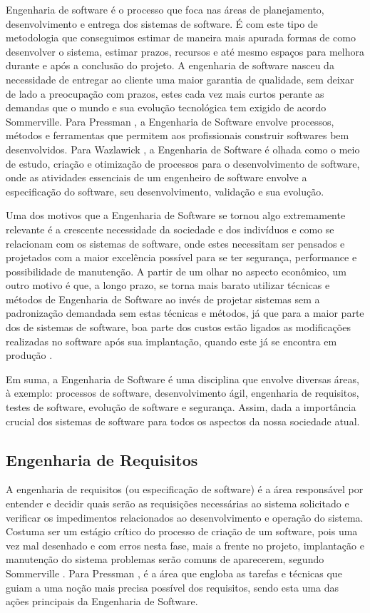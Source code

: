 Engenharia de software é o processo que foca nas áreas de planejamento, desenvolvimento e entrega dos sistemas de software. É com este tipo de metodologia que conseguimos estimar de maneira mais apurada formas de como desenvolver o sistema, estimar prazos, recursos e até mesmo espaços para melhora durante e após a conclusão do projeto. A engenharia de software nasceu da necessidade de entregar ao cliente uma maior garantia de qualidade, sem deixar de lado a preocupação com prazos, estes cada vez mais curtos perante as demandas que o mundo e sua evolução tecnológica tem exigido de acordo Sommerville\cite{Sommerville07}. Para Pressman \cite{pressman}, a Engenharia de Software envolve processos, métodos e ferramentas que permitem aos profissionais
construir softwares bem desenvolvidos. Para Wazlawick \cite{wazlawick}, a Engenharia de Software é olhada como o meio de estudo, criação e otimização de processos para o desenvolvimento de software, onde as atividades essenciais de um engenheiro de software envolve a especificação do software, seu desenvolvimento, validação e sua evolução.

Uma dos motivos que a Engenharia de Software se tornou algo extremamente relevante é a crescente necessidade da sociedade e dos indivíduos e como se relacionam com os sistemas de software, onde estes necessitam ser pensados e projetados com a maior excelência possível para se ter segurança, performance e possibilidade de manutenção. A partir de um olhar no aspecto econômico, um outro motivo é que, a longo prazo, se torna mais barato utilizar técnicas e métodos de Engenharia de Software ao invés de projetar sistemas sem a padronização demandada sem estas técnicas e métodos, já que para a maior parte dos de sistemas de software, boa parte dos custos estão ligados as modificações realizadas no software após sua implantação, quando este já se encontra em produção \cite{Sommerville07}.

Em suma, a Engenharia de Software é uma disciplina que envolve diversas áreas, à exemplo: processos de software, desenvolvimento ágil, engenharia de requisitos, testes
de software, evolução de software e segurança. Assim, dada a importância crucial dos sistemas de software para todos os aspectos da nossa sociedade atual.

\subsection{Engenharia de Requisitos}

A engenharia de requisitos (ou especificação de software) é a área responsável por entender e decidir quais serão as requisições necessárias ao sistema solicitado e verificar os impedimentos relacionados ao desenvolvimento e operação do sistema. Costuma ser um estágio crítico do processo de criação de um software, pois uma vez mal desenhado e com erros nesta fase, mais a frente no projeto, implantação e manutenção do sistema problemas serão comuns de aparecerem, segundo Sommerville \cite{Sommerville07}. Para Pressman \cite{pressman}, é a área que engloba as tarefas e técnicas que guiam a uma noção mais precisa possível dos requisitos, sendo esta uma das ações principais da Engenharia de Software. 

